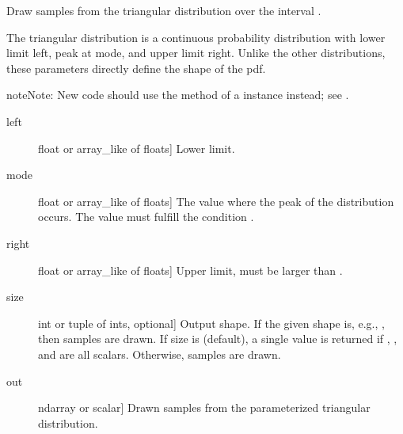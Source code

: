 \documentclass[letterpaper,10pt,english]{sphinxmanual}
\begin{document}
\begin{fulllineitems}
\label{\detokenize{infrapy.utils:infrapy.utils.ref2sac.triangular}}
Draw samples from the triangular distribution over the
interval .

The triangular distribution is a continuous probability
distribution with lower limit left, peak at mode, and upper
limit right. Unlike the other distributions, these parameters
directly define the shape of the pdf.

\begin{sphinxadmonition}{note}{Note:}
New code should use the  method of a 
instance instead; see .
\end{sphinxadmonition}
\begin{description}
\item[{left}] \leavevmode{[}float or array\_like of floats{]}
Lower limit.

\item[{mode}] \leavevmode{[}float or array\_like of floats{]}
The value where the peak of the distribution occurs.
The value must fulfill the condition .

\item[{right}] \leavevmode{[}float or array\_like of floats{]}
Upper limit, must be larger than .

\item[{size}] \leavevmode{[}int or tuple of ints, optional{]}
Output shape.  If the given shape is, e.g., , then
 samples are drawn.  If size is  (default),
a single value is returned if , , and 
are all scalars.  Otherwise, 
samples are drawn.

\end{description}
\begin{description}
\item[{out}] \leavevmode{[}ndarray or scalar{]}
Drawn samples from the parameterized triangular distribution.


\end{description}
\end{fulllineitems}
\end{document}
